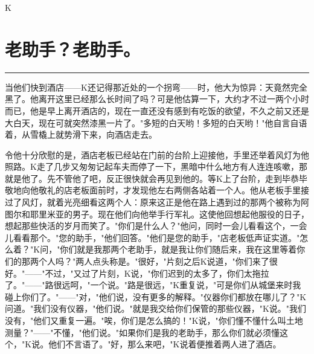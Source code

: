 \documentclass[12pt,a4paper]{article}
\begin{document}
K

\newpage
\section{老助手？老助手。}
\vspace{0.5em}
\vspace{0.3em}

\noindent\rule{\textwidth}{0.4pt}

\vspace{0.3em}



当他们快到酒店——K还记得那近处的一个拐弯——时，他大为惊异：天竟然完全黑了。他离开这里已经那么长时间了吗？可是他估算一下，大约才不过一两个小时而已，他是早上离开酒店的，现在一直还没有感到有吃饭的欲望，不久之前又还是大白天，现在可就突然漆黑一片了。"多短的白天哟！多短的白天哟！"他自言自语着，从雪橇上就势滑下来，向酒店走去。

令他十分欣慰的是，酒店老板已经站在门前的台阶上迎接他，手里还举着风灯为他照路。K走了几步又匆匆记起车夫而停了一下，黑暗中什么地方有人连连咳嗽，那就是他了。先不管他了吧，反正很快就会再见到他的。等K上了台阶，走到毕恭毕敬地向他敬礼的店老板面前时，才发现他左右两侧各站着一个人。他从老板手里接过了风灯，就着光亮细看这两个人：原来这正是他在路上遇到过的那两个被称为阿图尔和耶里米亚的男子。现在他们向他举手行军礼。这使他回想起他服役的日子，想起那些快活的岁月而笑了。"你们是什么人？"他问，同时一会儿看看这个，一会儿看看那个。"您的助手，"他们回答。"他们是您的助手，"店老板低声证实道。"怎么着？"K问，"你们就是我那两个老助手，就是我让你们随后来，我在这里等着你们的那两个人吗？"两人点头称是。"很好，"片刻之后K说道，"你们来了很好。"——"不过，"又过了片刻，K说，"你们迟到的太多了，你们太拖拉了。"——"路很远呵，"一个说。"路是很远，"K重复说，"可是你们从城堡来时我碰上你们了。"——"对，"他们说，没有更多的解释。"仪器你们都放在哪儿了？"K问道。"我们没有仪器，"他们说。"就是我交给你们保管的那些仪器，"K说。"我们没有，"他们又重复一遍。"唉，你们是怎么搞的！"K说，"你们懂不懂什么叫土地测量？"——"不懂，"他们说。"如果你们是我的老助手，那么你们就必须懂这个，"K说。他们不言语了。"好，那么来吧，"K说着便推着两人进了酒店。
\end{document}

